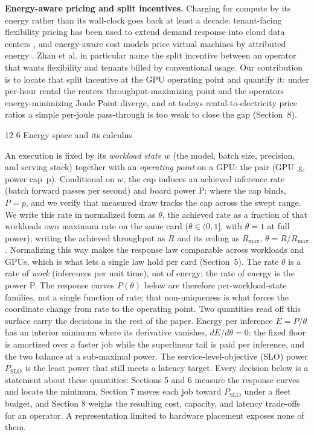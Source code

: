 \documentclass[3p,twocolumn]{elsarticle}
\makeatletter
\renewcommand\section{\@startsection{section}{1}{\z@}%
           {12\p@ \@plus 4\p@ \@minus 4\p@}%
           {6\p@ \@plus 4\p@ \@minus 3\p@}%
           {\normalsize\bfseries\boldmath}}
\makeatother
\begin{document}
\textbf{Energy-aware pricing and split incentives.} Charging for compute by its energy rather than its wall-clock
goes back at least a decade: tenant-facing flexibility pricing has been used to extend demand response into cloud data
centers \cite{ref56}, and energy-aware cost models price virtual machines by attributed energy \cite{ref57, ref58}. Zhan et al.
\cite{ref56} in particular name the split incentive between an operator that wants flexibility and tenants billed by
conventional usage. Our contribution is to locate that split incentive at the GPU operating point and quantify
it: under per-hour rental the renter\textquotesingle s throughput-maximizing point and the operator\textquotesingle s energy-minimizing Joule Point diverge, and at today\textquotesingle s rental-to-electricity price ratios a simple per-joule pass-through is too weak to
close the gap (Section~8).

\section{Energy space and its calculus}\label{energy-space-and-its-calculus}

An execution is fixed by its \emph{workload state} {\(w\)} (the model, batch size, precision,
and serving stack) together with an \emph{operating point} on a GPU: the pair (GPU~g, power cap~p).
Conditional on {\(w\)}, the cap induces an achieved inference rate (batch forward passes per
second) and board power P; where the cap binds, {\(P=p\)}, and we verify that measured draw tracks
the cap across the swept range. We write this rate in normalized form as {\(\theta\)}, the achieved
rate as a fraction of that workload\textquotesingle s own maximum rate on the same card ({\(\theta\in(0,1]\)},
with {\(\theta=1\)} at full power); writing the achieved throughput as {\(R\)} and its ceiling as
{\(R_{\max}\)}, {\(\theta=R/R_{\max}\)}. Normalizing this way makes the response law comparable across workloads and
GPUs, which is what lets a single law hold per card (Section~5). The rate {\(\theta\)} is a
rate of \emph{work} (inferences per unit time), not of energy; the rate of energy is the power P. The response curves {\(P(\theta)\)} below are therefore
per-workload-state families, not a single function of rate; that non-uniqueness is what forces the coordinate
change from rate to the operating point. Two quantities read off this surface carry the decisions in the rest of
the paper. Energy per inference {\(E=P/\theta\)} has an interior minimum where its derivative
vanishes, {\(dE/d\theta=0\)}: the fixed floor is amortized over a faster job while the superlinear tail
is paid per inference, and the two balance at a sub-maximal power. The service-level-objective (SLO) power
{\(P_{\mathrm{SLO}}\)} is the least power that still meets a latency target. Every decision below is a
statement about these quantities: Sections 5 and 6 measure the response curves and locate the minimum,
Section 7 moves each job toward {\(P_{\mathrm{SLO}}\)} under a fleet budget, and Section 8 weighs the
resulting cost, capacity, and latency trade-offs for an operator. A representation limited to hardware placement exposes none of them.
\end{document}

